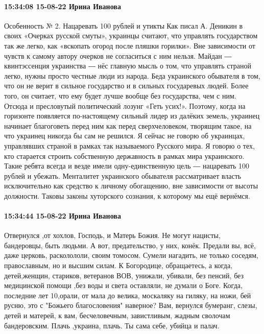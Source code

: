 \paragraph{15:34:08 15-08-22 Ирина Иванова}

Особенность № 2. Нацаревать 100 рублей и утиктыКак писал А. Деникин в своих
«Очерках русской смуты», украинцы считают, что управлять государством так же
легко, как «вскопать огород после пляшки горилки». Вне зависимости от чувств к
самому автору очерков не согласиться с ним нельзя. Майдан ― квинтэссенция
украинства ― нёс главную мысль о том, что управлять страной легко, нужны просто
честные люди из народа. Беда украинского обывателя в том, что он не верит в
сильное государство и в сильных государевых людей. Более того, он считает, что
ему будет лучше вообще без государства, чем с ним. Отсюда и пресловутый
политический лозунг «Геть усих!». Поэтому, когда на горизонте появляется
по-настоящему сильный лидер из далёких земель, украинец начинает благоговеть
перед ним как перед сверхчеловеком, творящим такое, на что украинец никогда бы
сам не решился. Я сейчас не говорю об украинцах, управлявших страной в рамках
так называемого Русского мира. Я говорю о тех, кто старается строить
собственную державность в рамках мира украинского. Такие ребята всегда и везде
имели одну-единственную цель ― нацаревать 100 рублей и убежать. Менталитет
украинского обывателя рассматривает власть исключительно как средство к личному
обогащению, вне зависимости от высоты должности. Таковы законы хуторского
сознания, к которому мы ещё вернёмся. 

\paragraph{15:34:44 15-08-22 Ирина Иванова}

Отвернулся ,от хохлов, Господь, и Матерь Божия. Не могут нацисты, бандеровцы,
быть людьми. А вот, предательство, у них, конёк. Предали вы, всё, даже церковь,
расколололи, своим томосом. Сумели нагадить, не только соседям, православным,
но и высшим силам. К Богородице, обращаетесь, а когда, детей,женщин, стариков,
ветеранов ВОВ, унижали, убивали, без пенсий, без медицинской помощи ,без воды и
света оставляли, не думали о Боге. Когда, последние лет 10,орали, от мала до
велика, москаляку на гиляку, на ножи, бей русню, это с "Божьего благословения"
наверное? Вам, вернулся бумеранг, слезы, детей и матерей, к вам, бесчеловечным,
завистливым, жадным сволочам бандеровским. Плачь ,украина, плачь. Ты сама себе,
убийца и палач.

